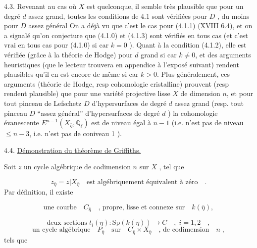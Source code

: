 4.3.   Revenant au cas où $X$ est quelconque, il semble très plausible que pour un degré $d$ assez grand, toutes les conditions de 4.1 sont vérifiées pour $D$ , du moins pour $D$ assez général  On a déjà vu que c'est le cas pour (4.1.1) (XVIII 6.4), et on a signalé qu'on conjecture que (4.1.0) et (4.1.3) sont vérifiés en tous cas (et c'est vrai en tous cas pour (4.1.0) si  car $k = 0$ ). Quant à la condition (4.1.2), elle est vérifiée (grâce à la théorie de Hodge) pour $d$ grand si  car $k \neq 0$, et des arguments heuristiques (que le lecteur trouvera en appendice à l'exposé suivant) rendent plausibles qu'il en est encore de même si car $k > 0$.    Plus généralement, ces arguments (théorie de Hodge, resp cohomologie cristalline) prouvent (resp  rendent plausible) que pour une variété projective lisse $X$ de dimension $n$, et pour tout pinceau de Lefschetz $D$ d'hypersurfaces de degré $d$ assez grand (resp. tout pinceau $D$ ``assez général''  d'hypersurfaces de degré $d$ ) la cohomologie évanescente $E^{n-1}(X_{\bar{\eta}}, \mathbb{Q}_{\ell})$ est de niveau égal à $n-1$  (i.e. n'est pas de niveau  $\leqslant n-3$, i.e. n'est pas de coniveau 1 ).


4.4.  \underline{Démonstration du théorème de Griffiths.}

Soit $z$ un cycle algébrique de codimension $n$ sur $X$ , tel que

\begin{equation}\tag{4.4.1}
z_{\bar{\eta}} = z|X_{\bar{\eta}} \quad \text{est algébriquement équivalent à zéro} \quad .
\end{equation}
Par définition, il existe

\begin{equation}\tag{4.4.2}
\text{une courbe} \quad C_{\bar{\eta}} \quad \text{, propre, lisse et connexe sur} \quad k(\bar{\eta}) , 
\end{equation}


\begin{equation}\tag{4.4.3}
 \text{deux sections} \; t_{i}(\bar{\eta}) : \mathrm{Sp}(k(\bar{\eta})) \longrightarrow C \quad , \; i=1,2 \quad ,
\end{equation}
\begin{equation}\tag{4.4.4}
\text{un cycle algébrique} \quad P_{\bar{\eta}} \quad \text{sur} \quad C_{\bar{\eta}} \times X_{\bar{\eta}} \quad \text{, de codimension} \quad n \; ,
\end{equation}
tels que

